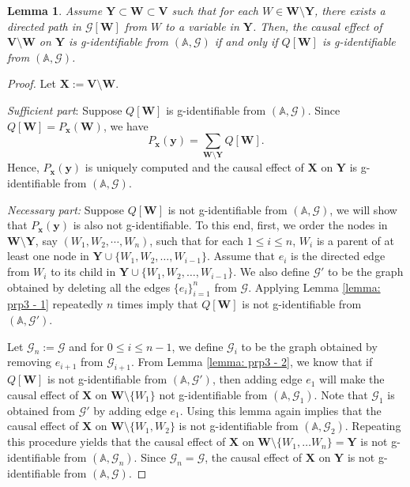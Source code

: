 \documentclass[accepted]{uai2022}
\newtheorem{lemma}{Lemma}
\newcommand{\V}[0]{\mathbf{V}}
\newcommand{\W}[0]{\mathbf{W}}
\newcommand{\X}[0]{\mathbf{X}}
\newcommand{\Y}[0]{\mathbf{Y}}
\newcommand{\x}[0]{\mathbf{x}}
\newcommand{\y}[0]{\mathbf{y}}
\newcommand{\G}[0]{\mathcal{G}}
\begin{document}
        \begin{lemma}\label{lemma: prp3 - 3}
            Assume $\Y \subset \W \subset \V$ such that for each $W \in \W \setminus \Y$, there exists a directed path in $\G[\W]$ from $W$ to a variable in $\Y$. 
            Then, the causal effect of $\V \setminus \W$ on $\Y$ is g-identifiable from $(\mathbb{A}, \G)$ if and only if $Q[\W]$ is g-identifiable from $(\mathbb{A}, \G)$. 
        \end{lemma}
        \begin{proof}
            Let $\X:=\V \setminus \W$. 
            
            \textit{Sufficient part}:
            Suppose $Q[\W]$ is g-identifiable from $(\mathbb{A}, \G)$.
            Since $Q[\W] = P_{\x}(\W)$, we have
            \begin{equation*}
                P_{\x}(\y) = \sum_{\W \setminus \Y} Q[\W].
            \end{equation*}
            Hence, $P_{\x}(\y)$ is uniquely computed and the causal effect of $\X$ on $\Y$ is g-identifiable from $(\mathbb{A}, \G)$. 
            
            \textit{Necessary part:} 
            Suppose $Q[\W]$ is not g-identifiable from $(\mathbb{A}, \G)$, we will show that $P_{\x}(\y)$ is also not g-identifiable. 
            To this end, first, we order the nodes in $\W \setminus \Y$, say $(W_1, W_2, \cdots, W_n)$, such that for each $1\leq i \leq n$, $W_i$ is a parent of at least one node in $\Y\cup \{W_1, W_2, \dots, W_{i-1}\}$. 
            Assume that $e_i$ is the directed edge from $W_i$ to its child in $\Y\cup \{W_1, W_2, \dots, W_{i-1}\}$.
            We also define $\G'$ to be the graph obtained by deleting all the edges $\{e_i\}_{i=1}^n$ from $\G$. 
            Applying Lemma \ref{lemma: prp3 - 1} repeatedly $n$ times imply that $Q[\W]$ is not g-identifiable from $(\mathbb{A},  \G')$.
            
            Let $\G_n:=\G$ and for $0\leq i\leq n-1$, we define $\G_i$ to be the graph obtained by removing $e_{i+1}$ from $\G_{i+1}$.
            From Lemma \ref{lemma: prp3 - 2}, we know that if $Q[\W]$ is not g-identifiable from $(\mathbb{A}, \G')$, then adding edge $e_1$ will make the causal effect of $\X$ on $\W \setminus \{W_1\}$ not g-identifiable from $(\mathbb{A}, \G_1)$.
            Note that $\G_1$ is obtained from $\G'$ by adding edge $e_1$. 
            Using this lemma again implies that the causal effect of $\X$ on $\W \setminus \{W_1, W_2\}$ is not g-identifiable from $(\mathbb{A}, \G_2)$. 
            Repeating this procedure yields that the causal effect of $\X$ on $\W \setminus \{W_1, \dots W_n\}=\Y$ is not g-identifiable from $(\mathbb{A}, \G_n)$. 
            Since $\G_n=\G$, the causal effect of $\X$ on $\Y$ is not g-identifiable from $(\mathbb{A}, \G)$. 
        \end{proof}
    
\end{document}
